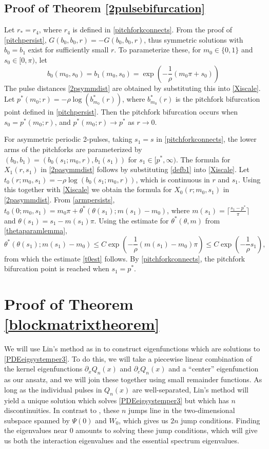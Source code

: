 \documentclass[12pt]{elsarticle}
\theoremstyle{plain}
\theoremstyle{definition}
\theoremstyle{remark}
\numberwithin{theorem}{section}
\numberwithin{equation}{section}
\begin{document}
\subsection{Proof of Theorem \ref{2pulsebifurcation}}

Let $r_* = r_4$, where $r_4$ is defined in \cref{pitchforkconnects}. From the proof of \cref{pitchpersist}, $G(b_0, b_0, r) = -G(b_0, b_0, r)$, thus symmetric solutions with $b_0 = b_1$ exist for sufficiently small $r$. To parameterize these, for $m_0 \in \{0, 1\}$ and $s_0 \in [0, \pi)$, let
\[
b_0(m_0, s_0) = b_1(m_0, s_0) = 
\exp\left( -\frac{1}{\rho}(m_0 \pi + s_0) \right)
\]
The pulse distances \cref{2psymmdist} are obtained by substituting this into \cref{Xiscale}. Let $p^*(m_0; r) = -\rho \log(b_{m_0}^*(r))$, where $b_{m_0}^*(r)$ is the pitchfork bifurcation point defined in \cref{pitchpersist}. Then the pitchfork bifurcation occurs when $s_0 = p^*(m_0; r)$, and $p^*(m_0; r) \rightarrow p^*$ as $r \rightarrow 0$.

For asymmetric periodic 2-pulses, taking $s_1 = s$ in \cref{pitchforkconnects}, the lower arms of the pitchforks are parameterized by $(b_0, b_1) = (b_0(s_1; m_0, r), b_1(s_1))$ for $s_1 \in [p^*, \infty)$. The formula for $X_1(r, s_1)$ in \cref{2pasymmdist} follows by substituting \cref{defb1} into \cref{Xiscale}. Let $t_0(r; m_0, s_1) = -\rho \log\left( b_0(s_1; m_0, r) \right)$, which is continuous in $r$ and $s_1$. Using this together with \cref{Xiscale} we obtain the formula for $X_0(r; m_0, s_1)$ in \cref{2pasymmdist}. From \cref{armpersists}, $t_0(0; m_0, s_1) = m_0 \pi + \theta^*(\theta(s_1); m(s_1) - m_0)$, where $m(s_1) = \lceil \frac{s_1 - p^*}{\pi} \rceil$ and $\theta(s_1) = s_1 - m(s_1) \pi$. Using the estimate for $\theta^*(\theta, m)$ from \cref{thetaparamlemma},
\[
\theta^*(\theta(s_1); m(s_1) - m_0) \leq C \exp\left(-\frac{1}{\rho} ( m(s_1) - m_0 )\pi \right) \leq C \exp\left(-\frac{1}{\rho} s_1 \right),
\]
from which the estimate \cref{t0est} follows. By \cref{pitchforkconnects}, the pitchfork bifurcation point is reached when $s_1 = p^*$.

\section{Proof of Theorem \ref{blockmatrixtheorem}}\label{sec:blockmatrixproof}

We will use Lin's method as in \cite{Sandstede1998} to construct eigenfunctions which are solutions to \cref{PDEeigsystemper3}. To do this, we will take a piecewise linear combination of the kernel eigenfunctions $\partial_x Q_n(x)$ and $\partial_c Q_n(x)$ and a ``center'' eigenfunction as our ansatz, and we will join these together using small remainder functions. As long as the individual pulses in $Q_n(x)$ are well-separated, Lin's method will yield a unique solution which solves \cref{PDEeigsystemper3} but which has $n$ discontinuities. In contrast to \cite{Sandstede1998}, these $n$ jumps line in the two-dimensional subspace spanned by $\Psi(0)$ and $W_0$, which gives us $2n$ jump conditions. Finding the eigenvalues near 0 amounts to solving these jump conditions, which will give us both the interaction eigenvalues and the essential spectrum eigenvalues.
\end{document}
